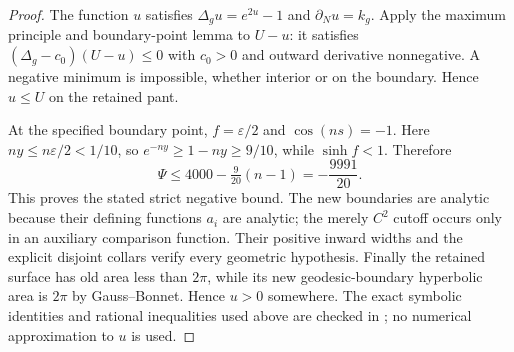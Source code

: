 \begin{proof}
The function $u$ satisfies $\Delta_gu=e^{2u}-1$ and $\partial_Nu=k_g$. Apply the maximum principle and boundary-point lemma to $U-u$: it satisfies $(\Delta_g-c_0)(U-u)\le0$ with $c_0>0$ and outward derivative nonnegative. A negative minimum is impossible, whether interior or on the boundary. Hence $u\le U$ on the retained pant.

At the specified boundary point, $f=\varepsilon/2$ and $\cos(ns)=-1$. Here $ny\le n\varepsilon/2<1/10$, so $e^{-ny}\ge1-ny\ge9/10$, while $\sinh f<1$. Therefore
\[
 \Psi\le4000-\tfrac9{20}(n-1)=-\frac{9991}{20}.
\]
This proves the stated strict negative bound. The new boundaries are analytic because their defining functions $a_i$ are analytic; the merely $C^2$ cutoff occurs only in an auxiliary comparison function. Their positive inward widths and the explicit disjoint collars verify every geometric hypothesis. Finally the retained surface has old area less than $2\pi$, while its new geodesic-boundary hyperbolic area is $2\pi$ by Gauss--Bonnet. Hence $u>0$ somewhere. The exact symbolic identities and rational inequalities used above are checked in ; no numerical approximation to $u$ is used.
\end{proof}
